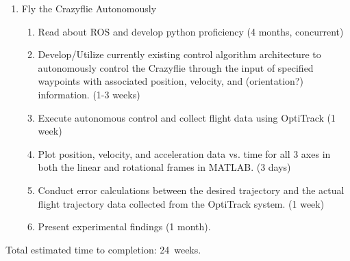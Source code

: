 \documentclass[onecolumn,10pt]{IEEEtran}
\newcommand{\myroot}{../}
\newcommand{\MATLAB}{MATLAB}
\begin{document}
\begin{enumerate}
\begin{enumerate}
\item Fly the Crazyflie Autonomously
\begin{enumerate}
\item Read about ROS and develop python proficiency (4 months, concurrent)
\item Develop/Utilize currently existing control algorithm architecture to autonomously control the Crazyflie through the input of specified waypoints with associated position, velocity, and (orientation?) information. (1-3 weeks)
\item Execute autonomous control and collect flight data using OptiTrack (1 week)
\item Plot position, velocity, and acceleration data vs. time for all 3 axes in both the linear and rotational frames in \MATLAB. (3 days)
\item Conduct error calculations between the desired trajectory and the actual flight trajectory data collected from the OptiTrack system. (1 week)
\item Present experimental findings (1 month).
\end{enumerate}

\end{enumerate}
\end{enumerate}

Total estimated time to completion: \SI{24}{weeks}.


  


%
\end{document}
